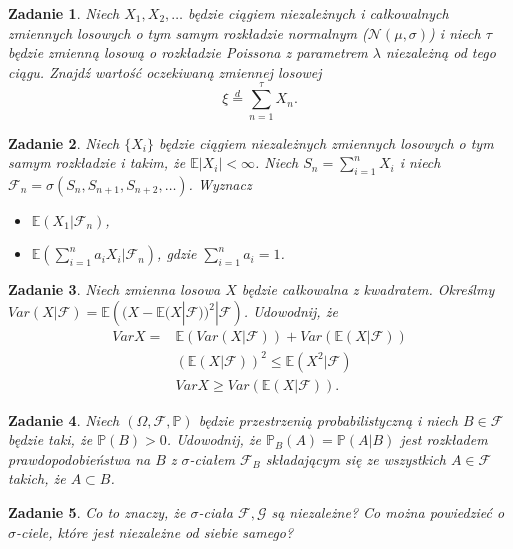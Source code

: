 \documentclass{mwart}
\newtheorem{zd}{Zadanie}
\begin{document}
\begin{zd}
	Niech $X_1, X_2, \dots $ będzie ciągiem niezależnych i całkowalnych zmiennych losowych o tym samym rozkładzie normalnym ($\mathcal{N}(\mu,\sigma)$) i niech $\tau$ będzie zmienną losową o rozkładzie Poissona z parametrem $\lambda$ niezależną od tego ciągu. Znajdź wartość oczekiwaną zmiennej losowej
	\begin{displaymath}
	\xi \stackrel{d}{=} \sum_{n=1}^\tau X_n.
	\end{displaymath}
\end{zd}

\begin{zd}
Niech $\{X_i\}$ będzie ciągiem niezależnych zmiennych losowych o tym samym rozkładzie i takim, że $\mathbb{E}|X_i|<\infty$. Niech $S_n = \sum_{i=1}^nX_i$ i niech $\mathcal{F}_n = \sigma\left(S_n, S_{n+1}, S_{n+2}, \dots\right)$. Wyznacz
\begin{itemize}
\item $\mathbb{E}(X_1|\mathcal{F}_n)$,
\item $\mathbb{E}\left(\sum_{i=1}^na_iX_i|\mathcal{F}_n\right)$, gdzie $\sum_{i=1}^na_i = 1$.
\end{itemize}
\end{zd}

\begin{zd}
	Niech zmienna losowa $X$ będzie całkowalna z kwadratem. Określmy $Var (X|\mathcal{F}) = \mathbb{E}\left((X-\mathbb{E}(X|\mathcal{F}))^2|\mathcal{F}\right)$. Udowodnij, że
	\begin{displaymath}
	\begin{split}
	VarX = &\mathbb{E}\left(Var(X|\mathcal{F})\right) + Var\left(\mathbb{E}(X|\mathcal{F})\right)\\ &\left(\mathbb{E}(X|\mathcal{F})\right)^2 \leq \mathbb{E}(X^2|\mathcal{F})\\
	& VarX \geq Var\left(\mathbb{E}(X|\mathcal{F})\right).
	\end{split}
	\end{displaymath}
\end{zd}

\begin{zd}
	Niech $(\Omega,\mathcal{F},\mathbb{P})$ będzie przestrzenią probabilistyczną i niech $B\in \mathcal{F}$ będzie taki, że $\mathbb{P}(B) > 0$. Udowodnij, że $\mathbb{P}_B(A) = \mathbb{P}(A|B)$ jest rozkładem prawdopodobieństwa na $B$ z $\sigma$-ciałem $\mathcal{F}_B$ składającym się ze wszystkich $A\in\mathcal{F}$ takich, że $A\subset B$.
\end{zd}

\begin{zd}
	Co to znaczy, że $\sigma$-ciała $\mathcal{F},\mathcal{G}$ są niezależne? Co można powiedzieć o $\sigma$-ciele, które jest niezależne od siebie samego?
\end{zd}
\end{document}
